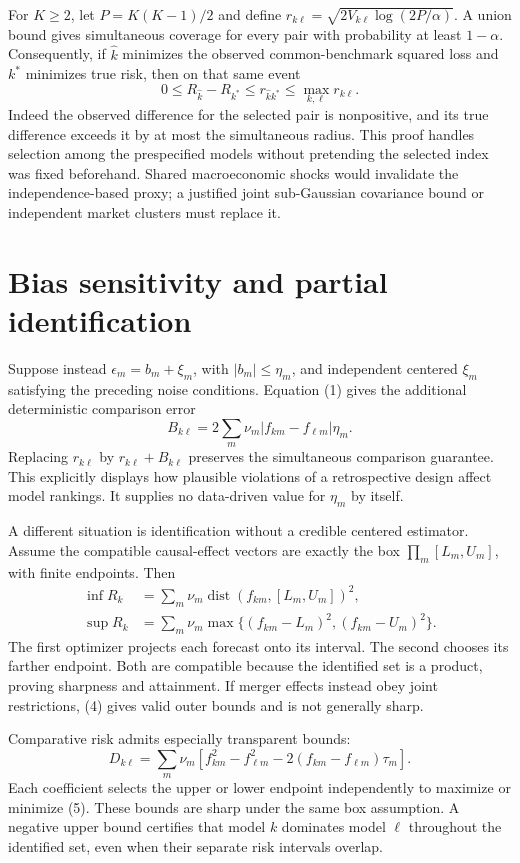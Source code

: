 \documentclass[11pt,a4paper]{article}
\DeclareMathOperator{\dist}{dist}
\begin{document}
For $K\geq2$, let $P=K(K-1)/2$ and define
$r_{k\ell}=\sqrt{2V_{k\ell}\log(2P/\alpha)}$. A union bound gives simultaneous
coverage for every pair with probability at least $1-\alpha$. Consequently,
if $\widehat k$ minimizes the observed common-benchmark squared loss and
$k^*$ minimizes true risk, then on that same event
\[
 0\leq R_{\widehat k}-R_{k^*}\leq r_{\widehat k k^*}
                  \leq\max_{k,\ell}r_{k\ell}.                \tag{3}
\]
Indeed the observed difference for the selected pair is nonpositive, and its
true difference exceeds it by at most the simultaneous radius. This proof
handles selection among the prespecified models without pretending the
selected index was fixed beforehand. Shared macroeconomic shocks would
invalidate the independence-based proxy; a justified joint sub-Gaussian
covariance bound or independent market clusters must replace it.

\section{Bias sensitivity and partial identification}
Suppose instead $\epsilon_m=b_m+\xi_m$, with $|b_m|\leq\eta_m$, and independent
centered $\xi_m$ satisfying the preceding noise conditions. Equation (1) gives
the additional deterministic comparison error
\[
 B_{k\ell}=2\sum_m\nu_m|f_{km}-f_{\ell m}|\eta_m.
\]
Replacing $r_{k\ell}$ by $r_{k\ell}+B_{k\ell}$ preserves the simultaneous
comparison guarantee. This explicitly displays how plausible violations of a
retrospective design affect model rankings. It supplies no data-driven value
for $\eta_m$ by itself.

A different situation is identification without a credible centered estimator.
Assume the compatible causal-effect vectors are exactly the box
$\prod_m[L_m,U_m]$, with finite endpoints. Then
\[
 \begin{split}
 \inf R_k&=\sum_m\nu_m\dist(f_{km},[L_m,U_m])^2,\\
 \sup R_k&=\sum_m\nu_m
       \max\{(f_{km}-L_m)^2,(f_{km}-U_m)^2\}.
 \end{split}\tag{4}
\]
The first optimizer projects each forecast onto its interval. The second
chooses its farther endpoint. Both are compatible because the identified set
is a product, proving sharpness and attainment. If merger effects instead
obey joint restrictions, (4) gives valid outer bounds and is not generally
sharp.

Comparative risk admits especially transparent bounds:
\[
 D_{k\ell}=\sum_m\nu_m
       [f_{km}^2-f_{\ell m}^2-2(f_{km}-f_{\ell m})\tau_m].
                                                               \tag{5}
\]
Each coefficient selects the upper or lower endpoint independently to maximize
or minimize (5). These bounds are sharp under the same box assumption. A
negative upper bound certifies that model $k$ dominates model $\ell$ throughout
the identified set, even when their separate risk intervals overlap.
\end{document}
